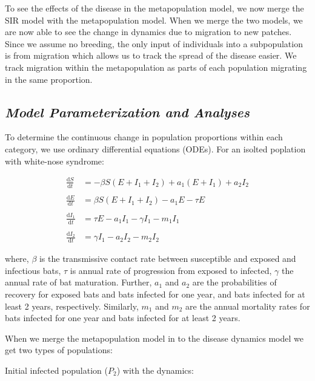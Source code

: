 \documentclass[12pt]{article}
\begin{document}
To see the effects of the disease in the metapopulation model, we now merge the SIR model with the metapopulation model. When we merge the two models, we are now able to see the change in dynamics due to migration to new patches. Since we assume no breeding, the only input of individuals into a subpopulation is from migration which allows us to track the spread of the disease easier. We track migration within the metapopulation as parts of each population migrating in the same proportion.

\subsection*{\sc \textit{Model Parameterization and Analyses}}

To determine the continuous change in population proportions within each category, we use ordinary differential equations (ODEs). For an isolted poplation with white-nose syndrome: 

\begin{align*}
                \frac{\mathrm{d}S}{\mathrm{d}t} & = -\beta S (E + I_1 + I_2) + a_1(E+I_1) + a_2I_2
            \\\\
                \frac{\mathrm{d}E}{\mathrm{d}t} & = \beta S (E + I_1 + I_2) - a_1 E - \tau E
            \\            \\
                \frac{\mathrm{d}I_1}{\mathrm{d}t} & = \tau E - a_1 I_1 - \gamma I_1 - m_1 I_1 
            \\            \\
                \frac{\mathrm{d}I_2}{\mathrm{d}t} & =  \gamma I_1 - a_2 I_2 - m_2 I_2
\end{align*}

where, $\beta$ is the transmissive contact rate between susceptible and exposed and infectious bats, $\tau$ is annual rate of progression from exposed to infected, $\gamma$ the annual rate of bat maturation. Further, $a_1$ and $a_2$ are the probabilities of recovery for exposed bats and bats infected for one year, and bats infected for at least 2 years, respectively. Similarly, $m_1$ and $m_2$ are the annual mortality rates for bats infected for one year and bats infected for at least 2 years.

When we merge the metapopulation model in to the disease dynamics model we get two types of populations:

Initial infected population ($P_2$) with the dynamics:
\end{document}
